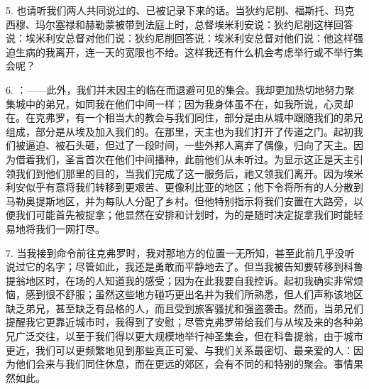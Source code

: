 5. 也请听我们两人共同说过的、已被记录下来的话。当狄约尼削、福斯托、玛克西穆、玛尔塞禄和赫勒蒙被带到法庭上时，总督埃米利安说：狄约尼削这样回答说：埃米利安总督对他们说：狄约尼削回答说：埃米利安总督对他们说：他这样强迫生病的我离开，连一天的宽限也不给。这样我还有什么机会考虑举行或不举行集会呢？\par

6. ：——此外，我们并未因主的临在而退避可见的集会。我却更加热切地努力聚集城中的弟兄，如同我在他们中间一样；因为我身体虽不在，如我所说，心灵却在。在克弗罗，有一个相当大的教会与我们同住，部分是由从城中跟随我们的弟兄组成，部分是从埃及加入我们的。在那里，天主也为我们打开了传道之门。起初我们被逼迫、被石头砸，但过了一段时间，一些外邦人离弃了偶像，归向了天主。因为借着我们，圣言首次在他们中间播种，此前他们从未听过。为显示这正是天主引领我们到他们那里的目的，当我们完成了这一服务后，祂又领我们离开。因为埃米利安似乎有意将我们转移到更艰苦、更像利比亚的地区；他下令将所有的人分散到马勒奥提斯地区，并为每队人分配了乡村。但他特别指示将我们安置在大路旁，以便我们可能首先被捉拿；他显然在安排和计划时，为的是随时决定捉拿我们时能轻易地将我们一网打尽。\par

7. 当我接到命令前往克弗罗时，我对那地方的位置一无所知，甚至此前几乎没听说过它的名字；尽管如此，我还是勇敢而平静地去了。但当我被告知要转移到科鲁提翁地区时，在场的人知道我的感受；因为在此我要自我控诉。起初我确实非常烦恼，感到很不舒服；虽然这些地方碰巧更出名并为我们所熟悉，但人们声称该地区缺乏弟兄，甚至缺乏有品格的人，而且受到旅客骚扰和强盗袭击。然而，当弟兄们提醒我它更靠近城市时，我得到了安慰；尽管克弗罗带给我们与从埃及来的各种弟兄广泛交往，以至于我们得以更大规模地举行神圣集会，但在科鲁提翁，由于城市更近，我们可以更频繁地见到那些真正可爱、与我们关系最密切、最亲爱的人：因为他们会来与我们同住休息，而在更远的郊区，会有不同的和特别的聚会。事情果然如此。\par

